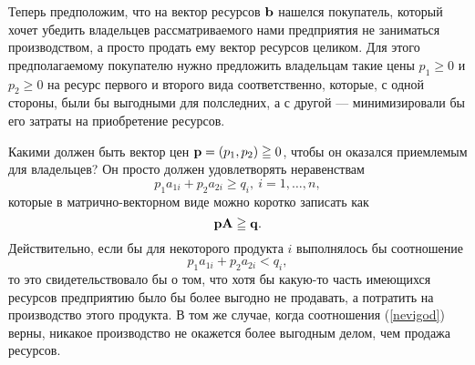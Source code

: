     Теперь предположим, что на вектор ресурсов $\mathbf{b}$ нашелся покупатель,
    который хочет убедить владельцев рассматриваемого нами
    предприятия не заниматься производством, а просто продать ему
    вектор ресурсов целиком. Для этого предполагаемому покупателю
    нужно предложить владельцам такие
    цены $p_{1}\geqslant0$ и $p_{2}\geqslant0$ на ресурс первого и второго
    вида соответственно, которые, с одной стороны, были
    бы выгодными для полследних, а с другой --- минимизировали бы
    его затраты на приобретение ресурсов.


    Какими должен быть вектор цен $\mathbf{p}=(p_{1},p_{2})\geqq0$, чтобы он
    оказался приемлемым для владельцев? Он просто должен
    удовлетворять неравенствам
\begin{equation}\label{nevigod}
    p_{1}a_{1i}+p_{2}a_{2i}\geqslant q_{i}, \ i=1,\ldots,n,
\end{equation}
    которые в матрично-векторном виде можно коротко записать как
    \[\mathbf{p}\mathbf{A}\geqq\mathbf{q}.\]
    Действительно, если бы для некоторого продукта $i$  выполнялось бы
    соотношение
    \[p_{1}a_{1i}+p_{2}a_{2i}<q_{i},\]
    то это свидетельствовало бы о том, что хотя бы какую-то часть
    имеющихся
    ресурсов предприятию было бы более выгодно не продавать, а потратить
    на производство этого продукта. В том же случае, когда
    соотношения (\ref{nevigod}) верны, никакое производство не
    окажется более выгодным делом, чем продажа ресурсов.

